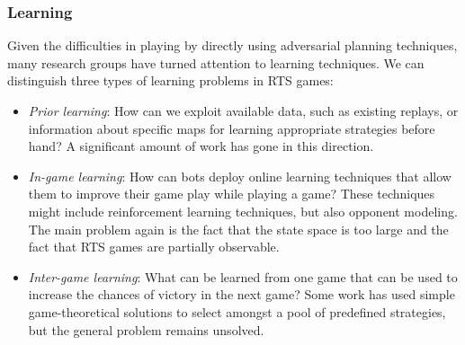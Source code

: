 \documentclass{llncs}
\begin{document}
\subsubsection*{Learning}
Given  the  difficulties  in  playing  by  directly  using
adversarial  planning techniques,  many  research  groups have  turned
attention to  learning techniques. We  can distinguish three  types of
learning problems in RTS games:
\begin{itemize}
\item {\em Prior learning}: How can we exploit available data, such as
  existing replays,  or information  about specific maps  for learning
  appropriate strategies before hand? A significant amount of work has
  gone in this
  direction.%
\item  {\em In-game  learning}: How  can bots  deploy online  learning
  techniques that allow them to  improve their game play while playing
  a  game?  These  techniques  might  include  reinforcement  learning
  techniques, but  also opponent modeling.  The main problem  again is
  the fact  that the state  space is too large  and the fact  that RTS
  games are partially observable.
\item {\em  Inter-game learning}:  What can be  learned from  one game
  that can  be used  to increase  the chances of  victory in  the next
  game? Some work has used simple game-theoretical solutions to select
  amongst a  pool of  predefined strategies,  but the  general problem
  remains unsolved.
\end{itemize}

\end{document}
